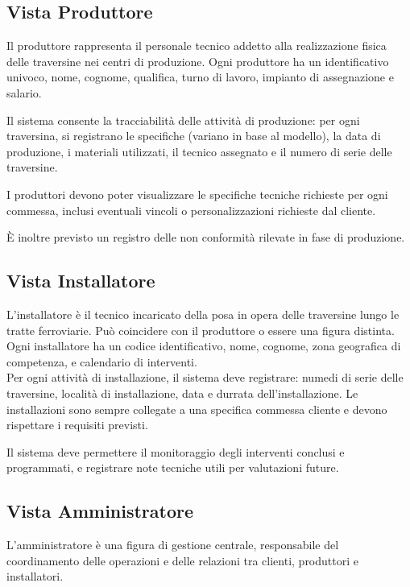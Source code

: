 \documentclass{article}
\begin{document}
\subsection{Vista Produttore}
Il produttore rappresenta il personale tecnico addetto alla realizzazione fisica delle traversine nei centri di produzione. Ogni produttore ha un identificativo univoco, nome, cognome, qualifica, turno di lavoro, impianto di assegnazione e salario.

\noindent Il sistema consente la tracciabilità delle attività di produzione: per ogni traversina, si registrano le specifiche (variano in base al modello), la data di produzione, i materiali utilizzati, il tecnico assegnato e il numero di serie delle traversine.

\noindent I produttori devono poter visualizzare le specifiche tecniche richieste per ogni commessa, inclusi eventuali vincoli o personalizzazioni richieste dal cliente.

\noindent È inoltre previsto un registro delle non conformità rilevate in fase di produzione.

\subsection{Vista Installatore}
L’installatore è il tecnico incaricato della posa in opera delle traversine lungo le tratte ferroviarie. Può coincidere con il produttore o essere una figura distinta. Ogni installatore ha un codice identificativo, nome, cognome, zona geografica di competenza, e calendario di interventi.\\

\noindent Per ogni attività di installazione, il sistema deve registrare: numedi di serie delle traversine, località di installazione, data e durrata dell'installazione. Le installazioni sono sempre collegate a una specifica commessa cliente e devono rispettare i requisiti previsti.

\noindent Il sistema deve permettere il monitoraggio degli interventi conclusi e programmati, e registrare note tecniche utili per valutazioni future.

\subsection{Vista Amministratore}
L’amministratore è una figura di gestione centrale, responsabile del coordinamento delle operazioni e delle relazioni tra clienti, produttori e installatori.\\
\end{document}
